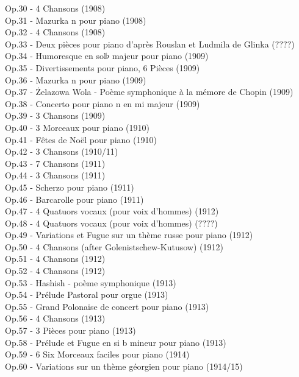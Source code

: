 Op.30 - 4 Chansons (1908)\\
Op.31 - Mazurka n pour piano (1908)\\
Op.32 - 4 Chansons (1908)\\
Op.33 - Deux pièces pour piano d'après Rouslan et Ludmila de Glinka ($????$)\\
Op.34 - Humoresque en sol$\flat$ majeur pour piano (1909)\\
Op.35 - Divertissements pour piano, 6 Pièces (1909)\\
Op.36 - Mazurka n pour piano (1909)\\
Op.37 - Żelazowa Wola - Poème symphonique à la mémore de Chopin (1909)\\
Op.38 - Concerto pour piano n en mi majeur (1909)\\
Op.39 - 3 Chansons (1909)\\
Op.40 - 3 Morceaux pour piano (1910)\\
Op.41 - Fêtes de Noël pour piano (1910)\\
Op.42 - 3 Chansons (1910/11)\\
Op.43 - 7 Chansons (1911)\\
Op.44 - 3 Chansons (1911)\\
Op.45 - Scherzo pour piano (1911)\\
Op.46 - Barcarolle pour piano (1911)\\
Op.47 - 4 Quatuors vocaux (pour voix d'hommes) (1912)\\
Op.48 - 4 Quatuors vocaux (pour voix d'hommes) ($????$)\\
Op.49 - Variations et Fugue sur un thème russe pour piano (1912)\\
Op.50 - 4 Chansons (after Golenistschew-Kutusow) (1912)\\
Op.51 - 4 Chansons (1912)\\
Op.52 - 4 Chansons (1912)\\
Op.53 - Hashish - poème symphonique (1913)\\
Op.54 - Prélude Pastoral pour orgue (1913)\\
Op.55 - Grand Polonaise de concert pour piano (1913)\\
Op.56 - 4 Chansons (1913)\\
Op.57 - 3 Pièces pour piano (1913)\\
Op.58 - Prélude et Fugue en si b mineur pour piano (1913)\\
Op.59 - 6 Six Morceaux faciles pour piano (1914)\\
Op.60 - Variations sur un thème géorgien pour piano (1914/15)\\
